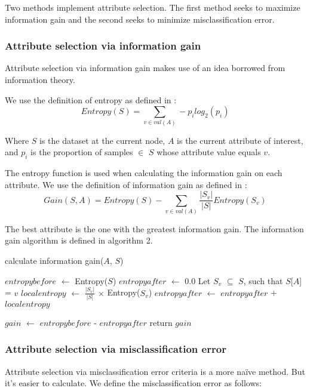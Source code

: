 \documentclass{IEEEtran}
\begin{document}
Two methods implement attribute selection. The first method seeks to
maximize information gain and the second seeks to minimize
misclassification error.

\subsubsection{Attribute selection via information gain}
Attribute selection via information gain makes use of an idea borrowed
from information theory.

We use the definition of entropy as defined
in \parencite{mitchell1997machine}:
\begin{equation}
\label{entropy-equation}
Entropy(S) = \sum_{v\in val(A)}-p_ilog_2(p_i)
\end{equation}

Where $S$ is the dataset at the current node, $A$ is the current
attribute of interest, and $p_i$ is the proportion of samples $\in$ $S$
whose attribute value equals $v$.

The entropy function is used when calculating the information gain on
each attribute. We use the definition of information gain as defined
in \parencite{mitchell1997machine}:
\begin{equation}
\label{information-gain-equation}
Gain(S,A) = Entropy(S) -\sum_{v \in val(A)}\frac{|S_v|}{|S|}Entropy(S_v)
\end{equation}

The best attribute is the one with the greatest information gain. The
information gain algorithm is defined in algorithm 2.

\begin{algorithm}
\caption{calculate information gain($A$, $S$)}
\begin{algorithmic}
\Statex{}
\State $entropybefore$ $\leftarrow$ Entropy($S$)
\State $entropyafter$ $\leftarrow$ 0.0
  \State Let $S_v$ $\subseteq$ $S$, such that $S$[$A$] = $v$
  \State $localentropy$ $\leftarrow$ $\frac{|S_v|}{|S|}$ $\times$ Entropy($S_v$)
  \State $entropyafter$ $\leftarrow$ $entropyafter$ + $localentropy$
\EndFor

\State $gain$ $\leftarrow$ $entropybefore$ - $entropyafter$
\State return $gain$
\end{algorithmic}
\end{algorithm}


\subsubsection{Attribute selection via misclassification error}
Attribute selection via misclassification error criteria is a more
na{\"i}ve method. But it's easier to calculate. We define the
misclassification error as follows:
\end{document}
